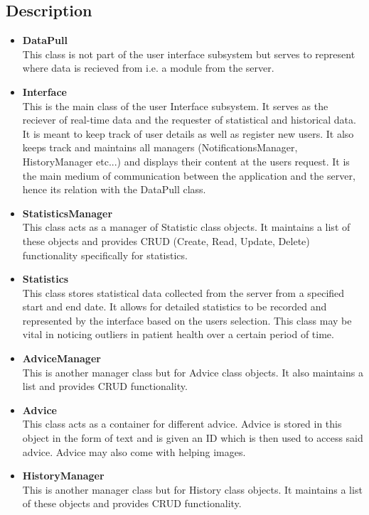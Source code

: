 \subsection{Description}
\begin{itemize}
	\item \textbf{DataPull}\\
	This class is not part of the user interface subsystem but serves to represent where data is recieved from i.e. a module from the server. 
	\item \textbf{Interface}\\
	This is the main class of the user Interface subsystem. It serves as the reciever of real-time data and the requester of statistical and historical data. It is meant to keep track of user details as well as register new users. It also keeps track and maintains all managers (NotificationsManager, HistoryManager etc...) and displays their content at the users request. It is the main medium of communication between the application and the server, hence its relation with the DataPull class. 
	\item \textbf{StatisticsManager}\\
	This class acts as a  manager of Statistic class objects. It maintains a list of these objects and provides CRUD (Create, Read, Update, Delete) functionality specifically for statistics. 
	\item \textbf{Statistics}\\
	This class stores statistical data collected from the server from a specified start and end date. It allows for detailed statistics to be recorded and represented by the interface based on the users selection. This class may be vital in noticing outliers in patient health over a certain period of time. 
	\item \textbf{AdviceManager}\\
	This is another manager class but for Advice class objects. It also maintains a list and provides CRUD functionality. 
	\item \textbf{Advice}\\
	This class acts as a container for different advice. Advice is stored in this object in the form of text and is given an ID which is then used to access said advice. Advice may also come with helping images.
  	\item \textbf{HistoryManager}\\
	This is another manager class but for History class objects. It maintains a list of these objects and provides CRUD functionality. 

\end{itemize}
